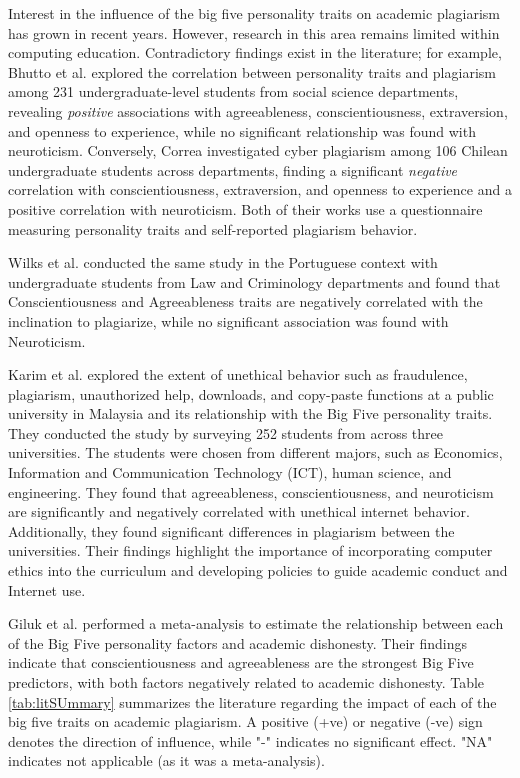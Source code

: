 Interest in the influence of the big five personality traits on academic plagiarism has grown in recent years. However, research in this area remains limited within computing education. Contradictory findings exist in the literature; for example, Bhutto et al. \cite{Bhutto2019ACS} explored the correlation between personality traits and plagiarism among 231 undergraduate-level students from social science departments, revealing \textit{positive} associations with agreeableness, conscientiousness, extraversion, and openness to experience, while no significant relationship was found with neuroticism. Conversely, Correa \cite{ChileanUniver} investigated cyber plagiarism among 106 Chilean undergraduate students across departments, finding a significant \textit{negative} correlation with conscientiousness, extraversion, and openness to experience and a positive correlation with neuroticism. Both of their works use a questionnaire measuring personality traits and self-reported plagiarism behavior.

Wilks et al. \cite{Wilks2016-WILPTA-3} conducted the same study in the Portuguese context with undergraduate students from Law and Criminology departments and found that Conscientiousness and Agreeableness traits are negatively correlated with the inclination to plagiarize, while no significant association was found with Neuroticism. 

Karim et al. \cite{karimExploringRelationshipInternet2009} explored the extent of unethical behavior such as fraudulence, plagiarism, unauthorized help, downloads, and copy-paste functions at a public university in Malaysia and its relationship with the Big Five personality traits. They conducted the study by surveying 252 students from across three universities. The students were chosen from different majors, such as Economics, Information and Communication Technology (ICT), human science, and engineering. They found that agreeableness, conscientiousness, and neuroticism are significantly and negatively correlated with unethical internet behavior. Additionally, they found significant differences in plagiarism between the universities. Their findings highlight the importance of incorporating computer ethics into the curriculum and developing policies to guide academic conduct and Internet use.

Giluk et al.\cite{Giluk2015BigFP} performed a meta-analysis to estimate the relationship between each of the Big Five personality factors and academic dishonesty. Their findings indicate that conscientiousness and agreeableness are the strongest Big Five predictors, with both factors negatively related to academic dishonesty. Table \ref{tab:litSUmmary} summarizes the literature regarding the impact of each of the big five traits on academic plagiarism. A positive (+ve) or negative (-ve) sign denotes the direction of influence, while "-" indicates no significant effect. "NA" indicates not applicable (as it was a meta-analysis). \vspace{-4pt}

